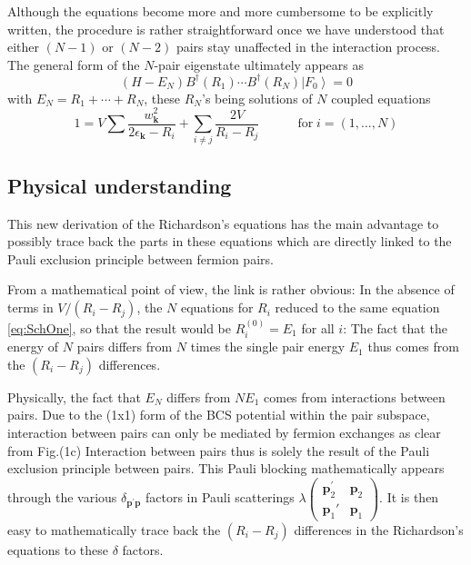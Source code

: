 \documentclass[aps,prb,superscriptaddress,twocolumn]{revtex4}
\newcommand{\vp}{\ensuremath{\mathbf{p}}}
\begin{document}
Although the equations become more and more cumbersome to be explicitly
written, the procedure is rather straightforward once we have understood
that either $(N-1)$ or $(N-2)$ pairs stay unaffected in the interaction process. The
general form of the $N$-pair eigenstate ultimately appears as 
\begin{equation}  \label{eq:SchThreeN}
(H-E _N)B^{\dagger}(R_1)\cdots{}B^{\dagger}(R_N)\left|F_0\right>  =0
\end{equation}
with $E _N=R_1+\cdots+R_N$, these $R_N$'s being solutions of $N$ coupled
equations 
\begin{equation}
1=V\sum\frac{w_{\mathbf{k} }^2}{2\epsilon_{\mathbf{k} }-R_i}+\sum_{i\neq{j}}%
\frac{2V}{R_i-R_j}\quad\qquad \text{for}\; i=\left(1,...,N\right) 
\end{equation}

\subsection{Physical understanding}

This new derivation of the Richardson's equations has the main advantage to
possibly trace back the parts in these equations which are directly linked
to the Pauli exclusion principle between fermion pairs.

From a mathematical point of view, the link is rather obvious: In the
absence of terms in $V/(R_i-R_j)$, the $N$ equations for $R_i$ reduced to
the same equation \eqref{eq:SchOne}, so that the result would be $R^{(0)}_i=%
E _1$ for all $i$: The fact that the energy of $N$ pairs differs
from $N$ times the single pair energy $E_1$ thus comes from the $(R_i-R_j)$
differences.

Physically, the fact that $E _N$ differs from $NE _1$
comes from interactions between pairs. Due to the (1x1) form of the BCS
potential within the pair subspace, interaction between pairs can only be mediated by fermion
exchanges as clear from Fig.(1c) 
Interaction between pairs thus
is solely the result of the Pauli exclusion principle between pairs. This
Pauli blocking mathematically appears through the various $\delta_{\mathbf{p}
^{\prime}\mathbf{p} }$ factors in Pauli scatterings $\lambda\left(%
\begin{smallmatrix}\vp^\prime_2&\vp_2\\\vp_1'&\vp_1\end{smallmatrix}\right)  $. It
is then easy to mathematically trace back the $(R_i-R_j)$ differences
 in the Richardson's equations to these $\delta$ factors.
\end{document}
